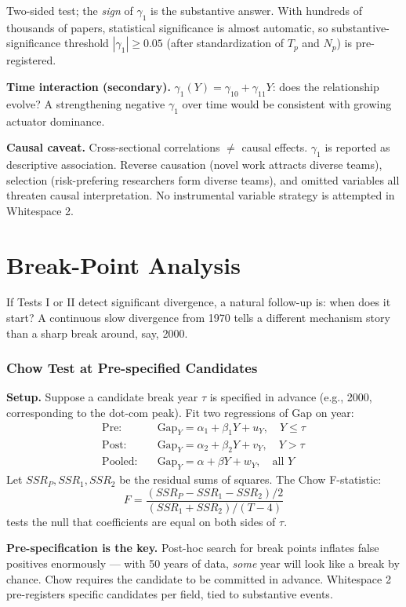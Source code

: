 \documentclass[11pt]{article}
\begin{document}
Two-sided test; the \textit{sign} of $\gamma_1$ is the substantive
answer. With hundreds of thousands of papers, statistical significance
is almost automatic, so substantive-significance threshold
$|\gamma_1| \ge 0.05$ (after standardization of $T_p$ and $N_p$) is
pre-registered.

\textbf{Time interaction (secondary).}
$\gamma_1(Y) = \gamma_{10} + \gamma_{11} Y$: does the relationship
evolve? A strengthening negative $\gamma_1$ over time would be
consistent with growing actuator dominance.

\textbf{Causal caveat.} Cross-sectional correlations $\ne$ causal
effects. $\gamma_1$ is reported as descriptive association. Reverse
causation (novel work attracts diverse teams), selection (risk-prefering
researchers form diverse teams), and omitted variables all threaten
causal interpretation. No instrumental variable strategy is attempted
in Whitespace 2.

\clearpage
\part{Break-Point Analysis}

If Tests I or II detect significant divergence, a natural follow-up is:
when does it start? A continuous slow divergence from 1970 tells a
different mechanism story than a sharp break around, say, 2000.

\section{Chow Test at Pre-specified Candidates}
\label{sec:chow}

\textbf{Setup.} Suppose a candidate break year $\tau$ is specified in
advance (e.g., 2000, corresponding to the dot-com peak). Fit two
regressions of Gap on year:
\begin{align*}
  \text{Pre:}& \quad \text{Gap}_Y = \alpha_1 + \beta_1 Y + u_Y,
  \quad Y \le \tau \\
  \text{Post:}& \quad \text{Gap}_Y = \alpha_2 + \beta_2 Y + v_Y,
  \quad Y > \tau \\
  \text{Pooled:}& \quad \text{Gap}_Y = \alpha + \beta Y + w_Y,
  \quad \text{all } Y
\end{align*}
Let $SSR_P, SSR_1, SSR_2$ be the residual sums of squares. The Chow
F-statistic:
\[
  F = \frac{(SSR_P - SSR_1 - SSR_2)/2}{(SSR_1 + SSR_2)/(T-4)}
\]
tests the null that coefficients are equal on both sides of $\tau$.

\textbf{Pre-specification is the key.} Post-hoc search for break
points inflates false positives enormously --- with 50 years of data,
\textit{some} year will look like a break by chance. Chow requires
the candidate to be committed in advance. Whitespace 2 pre-registers
specific candidates per field, tied to substantive events.
\end{document}
